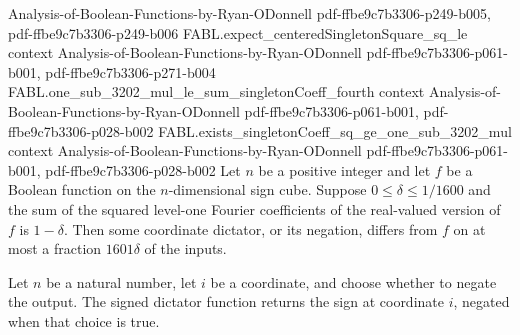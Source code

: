 \begin{theorem}
  {Analysis-of-Boolean-Functions-by-Ryan-ODonnell}
  {pdf-ffbe9c7b3306-p249-b005,
    pdf-ffbe9c7b3306-p249-b006}
\proofstep
  {FABL.expect_centeredSingletonSquare_sq_le}
  {context}
  {Analysis-of-Boolean-Functions-by-Ryan-ODonnell}
  {pdf-ffbe9c7b3306-p061-b001,
    pdf-ffbe9c7b3306-p271-b004}
\proofstep
  {FABL.one_sub_3202_mul_le_sum_singletonCoeff_fourth}
  {context}
  {Analysis-of-Boolean-Functions-by-Ryan-ODonnell}
  {pdf-ffbe9c7b3306-p061-b001,
    pdf-ffbe9c7b3306-p028-b002}
\proofstep
  {FABL.exists_singletonCoeff_sq_ge_one_sub_3202_mul}
  {context}
  {Analysis-of-Boolean-Functions-by-Ryan-ODonnell}
  {pdf-ffbe9c7b3306-p061-b001,
    pdf-ffbe9c7b3306-p028-b002}
Let $n$ be a positive integer and let $f$ be a Boolean function on the $n$-dimensional
sign cube. Suppose $0\leq\delta\leq 1/1600$ and the sum of the squared level-one Fourier
coefficients of the real-valued version of $f$ is $1-\delta$. Then some coordinate
dictator, or its negation, differs from $f$ on at most a fraction $1601\delta$ of the
inputs.
\end{theorem}

\begin{definition}
\label{FABL.signedDictator}
\leanok
{}
Let $n$ be a natural number, let $i$ be a coordinate, and choose whether to negate the
output. The signed dictator function returns the sign at coordinate $i$, negated when
that choice is true.
\end{definition}


